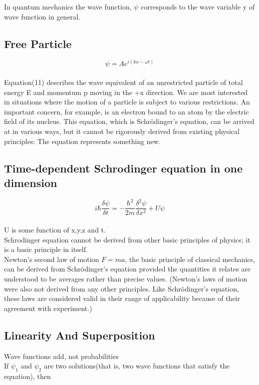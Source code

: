 \documentclass{article}
\begin{document}
In quantum mechanics the wave function, $\psi$ corresponds to the wave variable y of wave function in general.

\subsection*{Free Particle}
\begin{equation}
    \psi=Ae^{i(kx-\omega t)}
\end{equation}
\\
Equation(11) describes the wave equivalent of an unrestricted particle of total energy E and momentum p moving in the +x direction. We are most interested in situations where the motion of
a particle is subject to various restrictions. An important concern, for example, is an
electron bound to an atom by the electric field of its nucleus. This equation, which is Schrödinger’s equation, can be arrived
at in various ways, but it cannot be rigorously derived from existing physical principles: The equation represents something new.

\subsection*{Time-dependent Schrodinger equation in one dimension}

\begin{equation}
    i\hbar \frac{\delta\psi}{\delta t}= -\frac{\hbar^2}{2m}\frac{\delta^2\psi}{\delta x^2}+U\psi
\end{equation}
\\
U is some function of x,y,z and t.\vspace{10pt}
\\
Schrodinger equation cannot be derived from other basic principles of physics; it is a basic principle in itself.\vspace{10pt}
\\
Newton's second law of motion $F = ma$, the basic principle of classical mechanics, can be derived from
Schrödinger's equation provided the quantities it relates are understood to be averages
rather than precise values. (Newton's laws of motion were also not derived from any
other principles. Like Schrödinger's equation, these laws are considered valid in their
range of applicability because of their agreement with experiment.)

\subsection*{Linearity And Superposition}
Wave functions add, not probabilities
\\
If $\psi_1$ and $\psi_2$ are two solutions(that is, two wave functions that satisfy the equation), then
\end{document}
